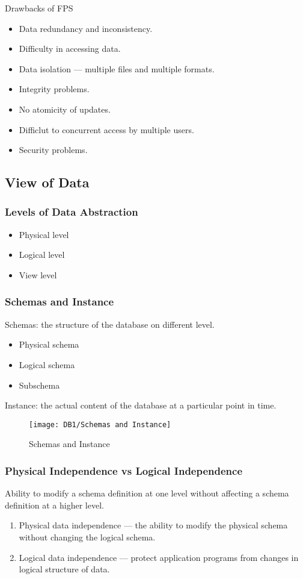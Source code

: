 Drawbacks of FPS
\begin{itemize}
    \item Data redundancy and inconsistency. 
    \item Difficulty in accessing data. 
    \item Data isolation --- multiple files and multiple formats. 
    \item Integrity problems. 
    \item No atomicity of updates. 
    \item Difficlut to concurrent access by multiple users. 
    \item Security problems. 
\end{itemize}

\subsection{View of Data}

\subsubsection{Levels of Data Abstraction}

\begin{itemize}
    \item Physical level
    \item Logical level
    \item View level
\end{itemize}

\subsubsection{Schemas and Instance}
Schemas: the structure of the database on different level. 
\begin{itemize}
    \item Physical schema
    \item Logical schema
    \item Subschema
\end{itemize}

Instance: the actual content of the database at a particular point in time. 

\begin{figure}[H]
    \centering
    \texttt{[image: DB1/Schemas and Instance]}
    \caption{Schemas and Instance}
\end{figure}


\subsubsection{Physical Independence vs Logical Independence}
Ability to modify a schema definition at one level without affecting a schema definition at a higher level.
\begin{enumerate}
    \item Physical data independence –-- the ability to modify the physical schema without changing the logical schema.
    \item Logical data independence –-- protect application programs from changes in logical structure of data. 
\end{enumerate}


